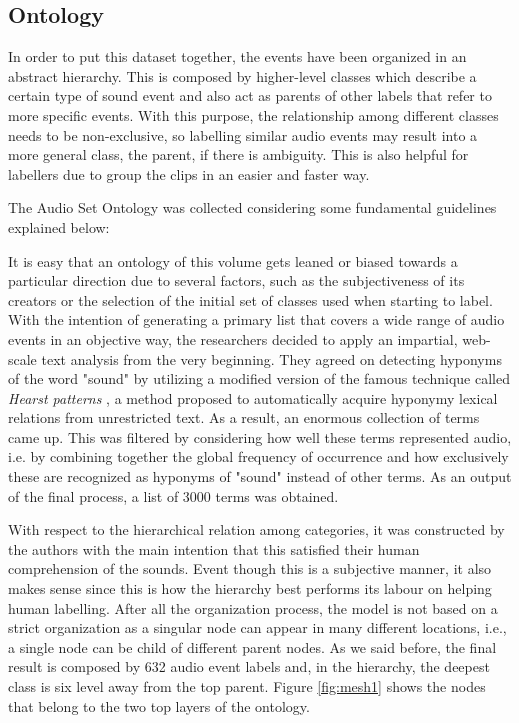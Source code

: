 \subsection{Ontology}
\label{subsecition:ontology}

	In order to put this dataset together, the events have been organized in an abstract hierarchy. This is composed by higher-level classes which describe a certain type of sound event and also act as parents of other labels that refer to more specific events. With this purpose, the relationship among different classes needs to be non-exclusive, so labelling similar audio events may result into a more general class, the parent, if there is ambiguity. This is also helpful for labellers due to group the clips in an easier and faster way.
	
	The Audio Set Ontology was collected considering some fundamental guidelines explained below:
	
	
	It is easy that an ontology of this volume gets leaned or biased towards a particular direction due to several factors, such as the subjectiveness of its creators or the selection of the initial set of classes used when starting to label. With the intention of generating a primary list that covers a wide range of audio events in an objective way, the researchers decided to apply an impartial, web-scale text analysis from the very beginning. They agreed on detecting hyponyms of the word "sound" by utilizing a modified version of the famous technique called \textit{Hearst patterns} \cite{Hearst1992}, a method proposed to automatically acquire hyponymy lexical relations from unrestricted text. As a result, an enormous collection of terms came up. This was filtered by considering how well these terms represented audio, i.e. by combining together the global frequency of occurrence and how exclusively these are recognized as hyponyms of "sound" instead of other terms. As an output of the final process, a list of 3000 terms was obtained.
	
	With respect to the hierarchical relation among categories, it was constructed by the authors with the main intention that this satisfied their human comprehension of the sounds. Event though this is a subjective manner, it also makes sense since this is how the hierarchy best performs its labour on helping human labelling.
	After all the organization process, the model is not based on a strict organization as a singular node can appear in many different locations, i.e., a single node can be child of different parent nodes. As we said before, the final result is composed by 632 audio event labels and, in the hierarchy, the deepest class is six level away from the top parent. Figure \ref{fig:mesh1} shows the nodes that belong to the two top layers of the ontology.
	

